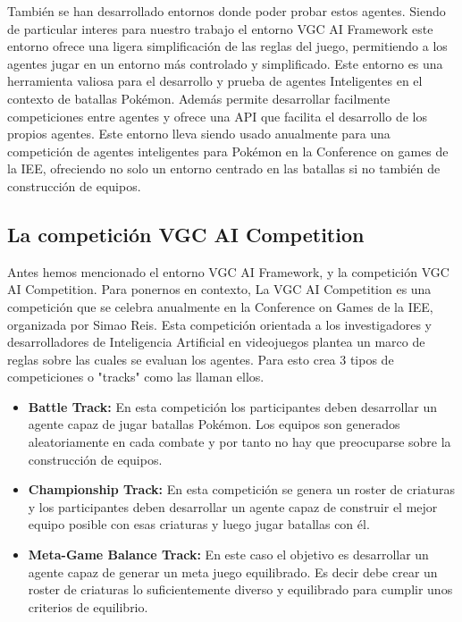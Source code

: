 También se han desarrollado entornos donde poder probar estos agentes. Siendo de particular interes para nuestro trabajo el entorno  VGC AI Framework \cite{VGCAICompetition} este entorno ofrece una ligera simplificación de las reglas del juego, permitiendo a los agentes jugar en un entorno más controlado y simplificado. Este entorno es una herramienta valiosa para el desarrollo y prueba de agentes Inteligentes en el contexto de batallas Pokémon. Además permite desarrollar facilmente competiciones entre agentes y ofrece una API que facilita el desarrollo de los propios agentes. Este entorno lleva siendo usado anualmente para una competición de agentes inteligentes para Pokémon en la Conference on games de la IEE, ofreciendo no solo un entorno centrado en las batallas si no también de construcción de equipos.

\subsection{La competición VGC AI Competition}

Antes hemos mencionado el entorno VGC AI Framework, y la competición VGC AI Competition. 
Para ponernos en contexto, La VGC AI Competition es una competición que se celebra anualmente en la Conference on Games de la IEE, organizada por Simao Reis. Esta competición orientada a los investigadores y desarrolladores de Inteligencia Artificial en videojuegos plantea un marco de reglas sobre las cuales se evaluan los agentes. Para esto crea 3 tipos de competiciones o "tracks" como las llaman ellos.
\begin{itemize}
    \item \textbf{Battle Track:} En esta competición los participantes deben desarrollar un agente capaz de jugar batallas Pokémon. Los equipos son generados aleatoriamente en cada combate y por tanto no hay que preocuparse sobre la construcción de equipos.
    \item \textbf{Championship Track:} En esta competición se genera un roster de criaturas y los participantes deben desarrollar un agente capaz de construir el mejor equipo posible con esas criaturas y luego jugar batallas con él.
    \item \textbf{Meta-Game Balance Track:} En este caso el objetivo es desarrollar un agente capaz de generar un meta juego equilibrado. Es decir debe crear un roster de criaturas lo suficientemente diverso y equilibrado para cumplir unos criterios de equilibrio.
\end{itemize}


